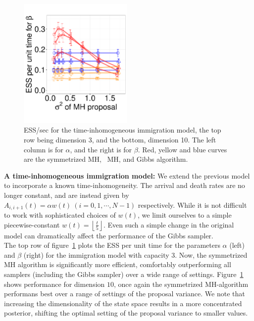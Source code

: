 \begin{figure}
\begin{minipage}[!hp]{0.68\linewidth}
    \includegraphics [width=0.49\textwidth, angle=0]{figs/pc_10_beta.pdf}
    \vspace{-.3 in}
  \end{minipage}
  \begin{minipage}[!hp]{0.01\linewidth}
  \end{minipage}
  \begin{minipage}[!hp]{0.3\linewidth}
    \caption{ESS/sec for the time-inhomogeneous immigration model, the top row 
      being dimension 3, and the bottom,
      dimension 10. The left column is for $\alpha$, and the 
    right is for $\beta$. Red, yellow and blue curves are the symmetrized MH,
  \naive\ MH, and Gibbs algorithm.}
     \label{fig:ESS_pc_10}
  \end{minipage}
  \end{figure}


\textbf{A time-inhomogeneous immigration model:}
We extend the previous model to incorporate a known time-inhomogeneity. 
The arrival and death rates are no longer constant, and are instead given by
$A_{i, i+1}(t) = \alpha w(t) \ (i =0,1,\cdots,N-1)$ respectively.
While it is not difficult to work with sophisticated choices of $w(t)$,
we limit ourselves to a simple piecewise-constant 
$w(t) = \left\lfloor \frac{t}{5} \right\rfloor$. Even such a simple
change in the original model can dramatically affect the performance
of the Gibbs sampler. \\
 The top row of figure~\ref{fig:ESS_pc_10} plots the ESS per unit time for the 
 parameters $\alpha$ (left) and $\beta$ (right) for the immigration model with 
 capacity $3$.  Now, the symmetrized MH algorithm is significantly 
 more efficient, comfortably outperforming all samplers (including the Gibbs 
 sampler) over a wide range of settings. %
 Figure~\ref{fig:ESS_pc_10} shows performance for dimension
 $10$, once again the symmetrized MH-algorithm performans best over a 
 range of settings of the proposal variance. We note that increasing the
 dimensionality of the state space results in a more concentrated posterior,
 shifting the optimal setting of the proposal variance to smaller values.

